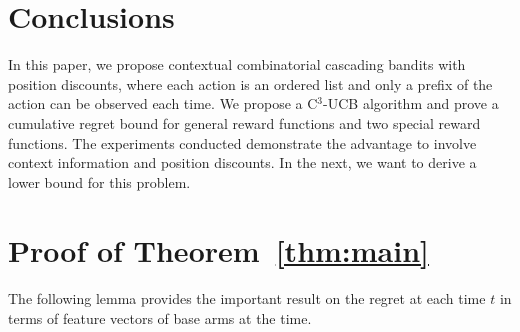 \documentclass{article}
\begin{document}



\section{Conclusions}

In this paper, we propose contextual combinatorial cascading bandits with position discounts, where each action is an ordered list and only a prefix of the action can be observed each time. We propose a C$^3$-UCB algorithm and prove a cumulative regret bound for general reward functions and two special reward functions. The experiments conducted demonstrate the advantage to involve context information and position discounts. In the next, we want to derive a lower bound for this problem.



\newpage



\newpage

\appendix

\section{Proof of Theorem~\ref{thm:main}}

The following lemma provides the important result on the regret at each time $t$ in terms of feature vectors of base arms at the time.
\end{document}
